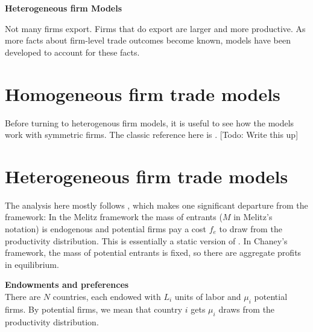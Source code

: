 \documentclass[11pt, pdftex]{article}
\newcommand{\ph}{\phantom}
\begin{document}
\ph{whatever}
\medskip

\centerline{\bf \Large Heterogeneous firm Models}

Not many firms export.  Firms that do export are larger and more productive.  As more facts about firm-level trade outcomes become known, models have been developed to account for these facts.

\section{Homogeneous firm trade models}
Before turning to heterogenous firm models, it is useful to see how the models work with symmetric firms.  The classic reference here is \citet{krugman80}. [Todo: Write this up]

\section{Heterogeneous firm trade models}
The analysis here mostly follows \citet{chaney08}, which makes one significant departure from the \citet{melitz} framework: In the Melitz framework the mass of entrants ($M$ in Melitz's notation) is endogenous and potential firms pay a cost $f_e$ to draw from the productivity distribution.  This is essentially a static version of \citet{hopenhayn}. In Chaney's framework, the mass of potential entrants is fixed, so there are aggregate profits in equilibrium.

\textbf{Endowments and preferences}\\
There are $N$ countries, each endowed with $L_i$ units of labor and $\mu_i$ potential firms.  By potential firms, we mean that country $i$ gets $\mu_i$ draws from the productivity distribution.
\end{document}
